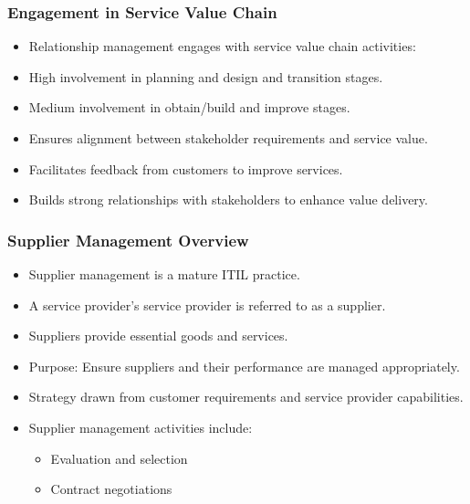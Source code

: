 \documentclass[aspectratio=169, table]{beamer}
\begin{document}
\begin{frame}
	\frametitle{Engagement in Service Value Chain}
	
	\begin{itemize}
		\item Relationship management engages with service value chain activities:
		\item High involvement in planning and design and transition stages.
		\item Medium involvement in obtain/build and improve stages.
		\item Ensures alignment between stakeholder requirements and service value.
		\item Facilitates feedback from customers to improve services.
		\item Builds strong relationships with stakeholders to enhance value delivery.
	\end{itemize}
	
\end{frame}

\begin{frame}
	\frametitle{Supplier Management Overview}
	
	\begin{itemize}
		\item Supplier management is a mature ITIL practice.
		\item A service provider’s service provider is referred to as a supplier.
		\item Suppliers provide essential goods and services.
		\item Purpose: Ensure suppliers and their performance are managed appropriately.
		\item Strategy drawn from customer requirements and service provider capabilities.
		\item Supplier management activities include:
		\begin{itemize}
			\item Evaluation and selection
			\item Contract negotiations
		\end{itemize}
	\end{itemize}
	
\end{frame}
\end{document}
